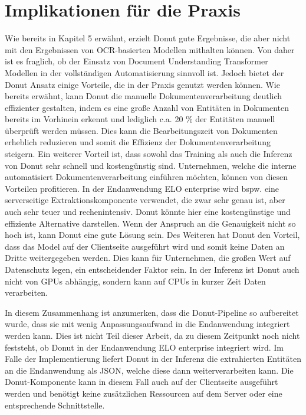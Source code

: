 \section{Implikationen für die Praxis}
Wie bereits in Kapitel 5 erwähnt, erzielt Donut gute Ergebnisse, die aber nicht mit den Ergebnissen von OCR-basierten Modellen mithalten können. Von daher ist es fraglich, ob der Einsatz von Document Understanding Transformer Modellen in der vollständigen Automatisierung sinnvoll ist. Jedoch bietet der Donut Ansatz einige Vorteile, die in der Praxis genutzt werden können. Wie bereits erwähnt, kann Donut die manuelle Dokumentenverarbeitung deutlich effizienter gestalten, indem es eine große Anzahl von Entitäten in Dokumenten bereits im Vorhinein erkennt und lediglich c.a. 20 \% der Entitäten manuell überprüft werden müssen. Dies kann die Bearbeitungszeit von Dokumenten erheblich reduzieren und somit die Effizienz der Dokumentenverarbeitung steigern. Ein weiterer Vorteil ist, dass sowohl das Training als auch die Inferenz von Donut sehr schnell und kostengünstig sind. Unternehmen, welche die interne automatisiert Dokumentenverarbeitung einführen möchten, können von diesen Vorteilen profitieren. In der Endanwendung ELO enterprise wird bspw. eine serverseitige Extraktionskomponente verwendet, die zwar sehr genau ist, aber auch sehr teuer und rechenintensiv. Donut könnte hier eine kostengünstige und effiziente Alternative darstellen. Wenn der Anspruch an die Genauigkeit nicht so hoch ist, kann Donut eine gute Lösung sein. Des Weiteren hat Donut den Vorteil, dass das Model auf der Clientseite ausgeführt wird und somit keine Daten an Dritte weitergegeben werden. Dies kann für Unternehmen, die großen Wert auf Datenschutz legen, ein entscheidender Faktor sein. In der Inferenz ist Donut auch nicht von GPUs abhängig, sondern kann auf CPUs in kurzer Zeit Daten verarbeiten. 

In diesem Zusammenhang ist anzumerken, dass die Donut-Pipeline so aufbereitet wurde, dass sie mit wenig Anpassungsaufwand in die Endanwendung integriert werden kann. Dies ist nicht Teil dieser Arbeit, da zu diesem Zeitpunkt noch nicht feststeht, ob Donut in der Endanwendung ELO enterprise integriert wird. Im Falle der Implementierung liefert Donut in der Inferenz die extrahierten Entitäten an die Endanwendung als JSON, welche diese dann weiterverarbeiten kann. Die Donut-Komponente kann in diesem Fall auch auf der Clientseite ausgeführt werden und benötigt keine zusätzlichen Ressourcen auf dem Server oder eine entsprechende Schnittstelle.

